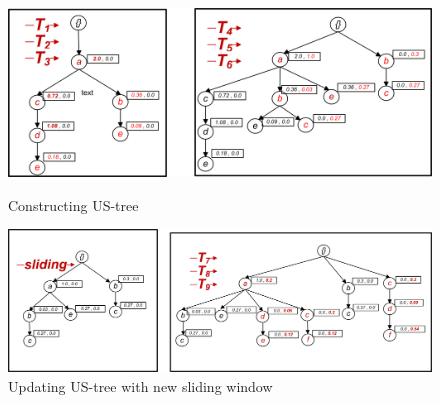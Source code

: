 \documentclass[conference]{IEEEtran}
\begin{document}
\begin{figure}[t]
    \begin{minipage}{0.5\linewidth}
        \centering
  		\includegraphics[width=.9\textwidth]{visio/sim_1_6_V2}
  		\caption{Constructing US-tree}
  		\label{figure:t1_6}
    \end{minipage}%
    \begin{minipage}{0.5\linewidth}
         \centering
  		 \includegraphics[width=.9\textwidth]{visio/sim_06_slide_789_V2}
  		 \caption{Updating US-tree with new sliding window}
  		 \label{figure:t7_9}
    \end{minipage}	
\end{figure}
\end{document}
